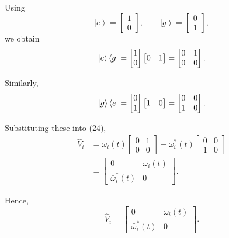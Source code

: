 \documentclass[12pt,a4paper]{article}
\newcommand{\ketg}{\left|g\right\rangle}
\newcommand{\kete}{\left|e\right\rangle}
\begin{document}
Using
\[
\kete
=
\begin{bmatrix}
1\\
0
\end{bmatrix},
\qquad
\ketg
=
\begin{bmatrix}
0\\
1
\end{bmatrix},
\]
we obtain
\[
\kete\bra g
=
\begin{bmatrix}
1\\
0
\end{bmatrix}
\begin{bmatrix}
0&1
\end{bmatrix}
=
\begin{bmatrix}
0&1\\
0&0
\end{bmatrix}.
\]

Similarly,
\[
\ketg\bra e
=
\begin{bmatrix}
0\\
1
\end{bmatrix}
\begin{bmatrix}
1&0
\end{bmatrix}
=
\begin{bmatrix}
0&0\\
1&0
\end{bmatrix}.
\]

Substituting these into (24),
\[
\begin{aligned}
\hat V_i
&=
\bar{\omega}_i(t)
\begin{bmatrix}
0&1\\
0&0
\end{bmatrix}
+
\bar{\omega}_i^{*}(t)
\begin{bmatrix}
0&0\\
1&0
\end{bmatrix}\\
&=
\begin{bmatrix}
0&\bar{\omega}_i(t)\\
\bar{\omega}_i^{*}(t)&0
\end{bmatrix}.
\end{aligned}
\]

Hence,
\begin{equation}
\boxed{
\hat V_i
=
\begin{bmatrix}
0&\bar{\omega}_i(t)\\
\bar{\omega}_i^{*}(t)&0
\end{bmatrix}.
}
\tag{25}
\end{equation}

\end{document}
